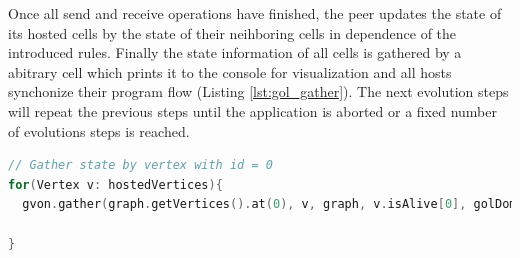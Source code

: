 Once all send and receive operations have finished, the peer updates
the state of its hosted cells by the state of their neihboring cells
in dependence of the introduced rules. Finally the state information
of all cells is gathered by a abitrary cell which prints it to the
console for visualization and all hosts synchonize their program flow
(Listing \ref{lst:gol_gather}). The next evolution steps will repeat the
previous steps until the application is aborted or a fixed number of
evolutions steps is reached.

\begin{lstlisting}[language=C++, label=lst:gol_gather, caption={\ } ]
// Gather state by vertex with id = 0
for(Vertex v: hostedVertices){
  gvon.gather(graph.getVertices().at(0), v, graph, v.isAlive[0], golDomain);

}
\end{lstlisting}


